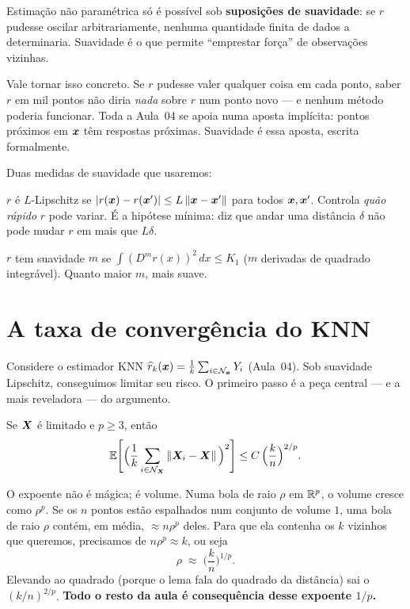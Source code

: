 \documentclass[11pt,a4paper]{article}
\begin{document}
\begin{ideia}
Estimação não paramétrica só é possível sob \textbf{suposições de suavidade}: se
$r$ pudesse oscilar arbitrariamente, nenhuma quantidade finita de dados a
determinaria. Suavidade é o que permite ``emprestar força'' de observações
vizinhas.
\end{ideia}

\noindent
Vale tornar isso concreto. Se $r$ pudesse valer qualquer coisa em cada ponto, saber
$r$ em mil pontos não diria \emph{nada} sobre $r$ num ponto novo --- e nenhum método
poderia funcionar. Toda a Aula~04 se apoia numa aposta implícita: pontos próximos em
$\bm{x}$ têm respostas próximas. Suavidade é essa aposta, escrita formalmente.

\noindent Duas medidas de suavidade que usaremos:
\begin{description}[leftmargin=2.2cm,style=nextline]
  \item[Lipschitz] $r$ é $L$-Lipschitz se
        $\left\lvert r(\bm{x})-r(\bm{x}') \right\rvert\le L\left\lVert \bm{x}-\bm{x}' \right\rVert$ para todos $\bm{x},\bm{x}'$. Controla
        \emph{quão rápido} $r$ pode variar. É a hipótese mínima: diz que andar uma
        distância $\delta$ não pode mudar $r$ em mais que $L\delta$.
  \item[Sobolev] $r$ tem suavidade $m$ se $\int (D^m r(x))^2\,dx \le K_1$
        ($m$ derivadas de quadrado integrável). Quanto maior $m$, mais suave.
\end{description}

\section{A taxa de convergência do KNN}
Considere o estimador KNN $\widehat{r}_k(\bm{x})=\frac1k\sum_{i\in\mathcal{N}_{\bm{x}}}Y_i$
(Aula~04). Sob suavidade Lipschitz, conseguimos limitar seu risco. O primeiro passo
é a peça central --- e a mais reveladora --- do argumento.

\begin{lema}\label{lem:viz}
Se $\bm{X}$ é limitado e $p\ge 3$, então
\[
  \mathbb{E}\!\left[\Big(\frac1k\sum_{i\in\mathcal{N}_{\bm{X}}}\left\lVert \bm{X}_i-\bm{X} \right\rVert\Big)^2\right]
  \le C\,\Big(\frac{k}{n}\Big)^{2/p}.
\]
\end{lema}

\begin{ideia}
O expoente não é mágica; é volume. Numa bola de raio $\rho$ em $\mathbb{R}^p$, o volume
cresce como $\rho^p$. Se os $n$ pontos estão espalhados num conjunto de volume $1$,
uma bola de raio $\rho$ contém, em média, $\approx n\rho^p$ deles. Para que ela
contenha os $k$ vizinhos que queremos, precisamos de $n\rho^p\approx k$, ou seja
\[
  \rho \;\approx\; \Big(\frac{k}{n}\Big)^{1/p}.
\]
Elevando ao quadrado (porque o lema fala do quadrado da distância) sai o
$(k/n)^{2/p}$. \textbf{Todo o resto da aula é consequência desse expoente $1/p$.}
\end{ideia}
\end{document}
